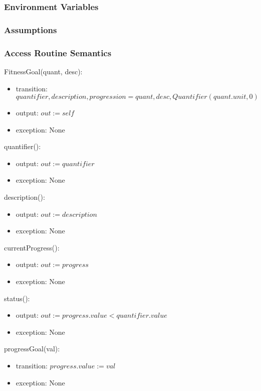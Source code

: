 \documentclass[12pt, titlepage]{article}
\begin{document}
\subsubsection{Environment Variables}

\subsubsection{Assumptions}

\subsubsection{Access Routine Semantics}

\newpage

\noindent FitnessGoal(quant, desc):
\begin{itemize}
	\item transition: $quantifier, description, progression = quant, desc, Quantifier(quant.unit, 0)$
	\item output: $out := self$
	\item exception: None
\end{itemize}

\noindent quantifier():
\begin{itemize}
	\item output: $out := quantifier$
	\item exception: None
\end{itemize}

\noindent description():
\begin{itemize}
	\item output: $out := description$
	\item exception: None
\end{itemize}

\noindent currentProgress():
\begin{itemize}
	\item output: $out := progress$
	\item exception: None
\end{itemize}

\noindent status():
\begin{itemize}
	\item output: $out := progress.value < quantifier.value $
	\item exception: None
\end{itemize}

\noindent progressGoal(val):
\begin{itemize}
	\item transition: $progress.value := val$
	\item exception: None
\end{itemize}
\end{document}
